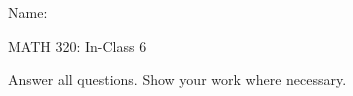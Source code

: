 \documentclass{article}
\begin{document}
\hspace{375pt}Name:

\begin{center}
{\Huge MATH 320: In-Class 6}

\end{center}

\bigskip\bigskip


Answer all questions. Show your work where necessary.\bigskip

\end{document}
